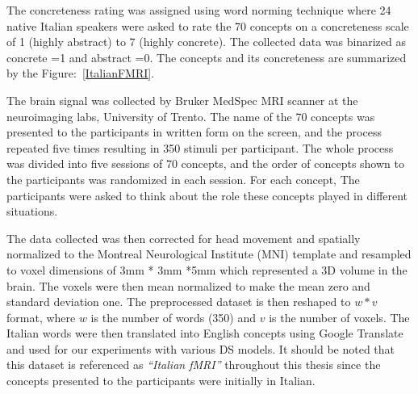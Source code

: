 The concreteness rating was assigned using word norming technique \cite{Barca2002WordNT} where 24 native Italian speakers were asked to rate the 70 concepts on a concreteness scale of 1 (highly abstract) to 7 (highly concrete). The collected data was binarized as concrete =1 and abstract =0. The concepts and its concreteness are summarized by the Figure:~\ref{ItalianFMRI}.

The brain signal was collected by Bruker MedSpec
MRI scanner at the neuroimaging labs, University of Trento. The name of the 70 concepts was presented to the participants in written form on the screen, and the process repeated five times resulting in 350 stimuli per participant. The whole process was divided into five sessions of 70 concepts, and the order of concepts shown to the participants was randomized in each session. For each concept, The participants were asked to think about the role these concepts played in different situations. 

The data collected was then corrected for head movement and spatially normalized to the Montreal Neurological Institute (MNI) template and resampled to voxel dimensions of 3mm * 3mm *5mm which represented a 3D volume in the brain. The voxels were then mean normalized to make the mean zero and standard deviation one. The preprocessed dataset is then reshaped to $w * v$ format, where $w$ is the number of words (350) and $v$ is the number of voxels. The Italian words were then translated into English concepts using Google Translate and used for our experiments with various DS models. It should be noted that this dataset is referenced as \textit{``Italian fMRI''} throughout this thesis since the concepts presented to the participants were initially in Italian. 



